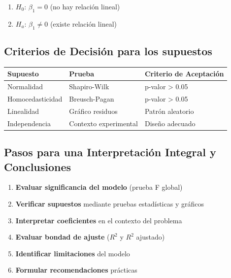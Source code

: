 \documentclass[
  spanish,
  letterpaper,
]{book}
\begin{document}
\begin{enumerate}
\def\labelenumi{\arabic{enumi}.}
\item
  \(H_0\)\hspace{0pt}: \(\beta_1 = 0\) (no hay relación lineal)
\item
  \(H_a\)\hspace{0pt}: \(\beta_1 \neq 0\) (existe relación lineal)
\end{enumerate}

\subsection{Criterios de Decisión para los
supuestos}\label{criterios-de-decisiuxf3n-para-los-supuestos}

\begin{longtable}[]{@{}lll@{}}
\toprule\noalign{}
Supuesto & Prueba & Criterio de Aceptación \\
\midrule\noalign{}
\endhead
\bottomrule\noalign{}
\endlastfoot
Normalidad & Shapiro-Wilk & p-valor \textgreater{} 0.05 \\
Homocedasticidad & Breusch-Pagan & p-valor \textgreater{} 0.05 \\
Linealidad & Gráfico residuos & Patrón aleatorio \\
Independencia & Contexto experimental & Diseño adecuado \\
\end{longtable}

\subsection{Pasos para una Interpretación Integral y
Conclusiones}\label{pasos-para-una-interpretaciuxf3n-integral-y-conclusiones}

\begin{enumerate}
\def\labelenumi{\arabic{enumi}.}
\item
  \textbf{Evaluar significancia del modelo} (prueba F global)
\item
  \textbf{Verificar supuestos} mediante pruebas estadísticas y gráficos
\item
  \textbf{Interpretar coeficientes} en el contexto del problema
\item
  \textbf{Evaluar bondad de ajuste} (\(R^2\) y \(R^2\) ajustado)
\item
  \textbf{Identificar limitaciones} del modelo
\item
  \textbf{Formular recomendaciones} prácticas
\end{enumerate}
\end{document}
